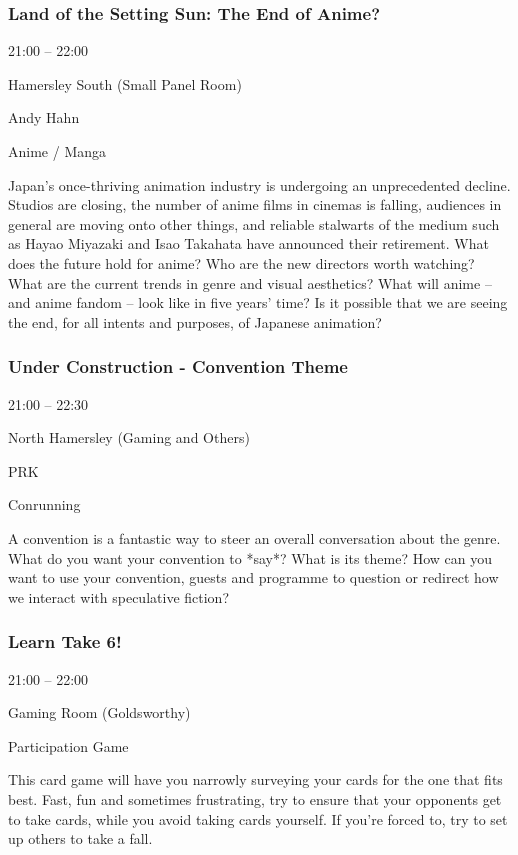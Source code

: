 \documentclass{scrreprt}
\begin{document}
\begin{multicols}{2}
\subsubsection*{Land of the Setting Sun: The End of Anime?}\begin{description}
\setlength{\itemsep}{0pt}
\setlength{\parsep}{0pt}
\setlength{\parskip}{0pt}
\item[Time:]{21:00 -- 22:00}
\item[Venue:]{Hamersley South (Small Panel Room)}
\item[People:]{Andy Hahn}
\item[Tags:]{Anime / Manga}\end{description}
Japan’s once-thriving animation industry is undergoing an unprecedented decline. Studios are closing, the number of anime films in cinemas is falling, audiences in general are moving onto other things, and reliable stalwarts of the medium such as Hayao Miyazaki and Isao Takahata have announced their retirement. What does the future hold for anime? Who are the new directors worth watching? What are the current trends in genre and visual aesthetics? What will anime – and anime fandom – look like in five years’ time? Is it possible that we are seeing the end, for all intents and purposes, of Japanese animation?
\subsubsection*{Under Construction - Convention Theme}\begin{description}
\setlength{\itemsep}{0pt}
\setlength{\parsep}{0pt}
\setlength{\parskip}{0pt}
\item[Time:]{21:00 -- 22:30}
\item[Venue:]{North Hamersley (Gaming and Others)}
\item[People:]{PRK}
\item[Tags:]{Conrunning}\end{description}
A convention is a fantastic way to steer an overall conversation about the genre. What do you want your convention to *say*? What is its theme? How can you want to use your convention, guests and programme to question or redirect how we interact with speculative fiction?
\subsubsection*{Learn Take 6!}\begin{description}
\setlength{\itemsep}{0pt}
\setlength{\parsep}{0pt}
\setlength{\parskip}{0pt}
\item[Time:]{21:00 -- 22:00}
\item[Venue:]{Gaming Room (Goldsworthy)}
\item[Tags:]{Participation Game}\end{description}
This card game will have you narrowly surveying your cards for the one that fits best. Fast, fun and sometimes frustrating, try to ensure that your opponents get to take cards, while you avoid taking cards yourself. If you're forced to, try to set up others to take a fall.

\end{multicols}
\end{document}
